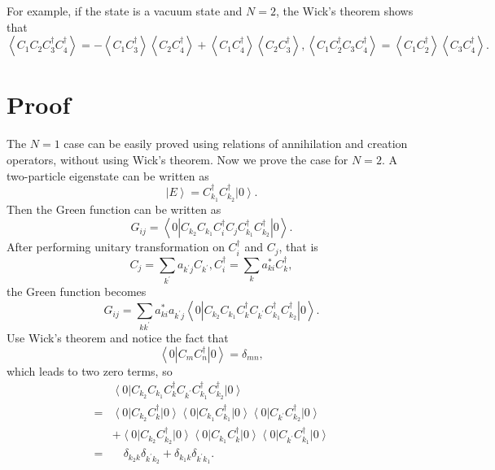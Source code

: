 \documentclass[prb,superscriptaddress,letter,10pt,onecolumn]{revtex4}
\begin{document}
For example, if the state is a vacuum state and $N=2$, the Wick's theorem shows that
\begin{equation}
	\left< C_1 C_2 C_3^\dagger C_4^\dagger \right> =
	-\left< C_1 C_3^\dagger\right>\left< C_2 C_4^\dagger\right>
	+\left< C_1 C_4^\dagger\right>\left< C_2 C_3^\dagger\right>, 
	\left< C_1 C_2^\dagger C_3 C_4^\dagger \right> =
	\left< C_1 C_2^\dagger\right>\left< C_3 C_4^\dagger\right>.
\end{equation}

\section{Proof}

The $N=1$ case can be easily proved using relations of annihilation and creation operators, without using Wick's theorem.
Now we prove the case for $N=2$.
A two-particle eigenstate can be written as
\begin{equation}
	\left|E\right> = C_{k_1}^\dagger C_{k_2}^\dagger\left|0\right>.
\end{equation}
Then the Green function can be written as
\begin{equation}
	G_{ij} = 
	\left< 0 \left| C_{k_2}C_{k_1}  C_i^\dagger C_j
	C_{k_1}^\dagger C_{k_2}^\dagger\right|0\right>.
\end{equation}
After performing unitary transformation on $C_i^\dagger$ and $C_j$, that is
\begin{equation}
	C_j = \sum_{k^{'}}a_{k^{'}j} C_{k^{'}},
	C_i^\dagger = \sum_{k}a_{ki}^* C_k^\dagger,
\end{equation}
the Green function becomes
\begin{equation}
	G_{ij} = \sum_{kk^{'}} a_{ki}^* a_{k^{'}j}
	\left< 0 \left| C_{k_2}C_{k_1}  C_k^\dagger C_{k^{'}}
	C_{k_1}^\dagger C_{k_2}^\dagger \right|0\right>.
\end{equation}
Use Wick's theorem and notice the fact that
\begin{equation}
	\left< 0 \left| C_m C_n^\dagger \right| 0 \right> = \delta_{mn},
\end{equation}
which leads to two zero terms, so
\begin{equation}
	\begin{aligned}
	&\left< 0 \right| C_{k_2}C_{k_1}  C_k^\dagger C_{k^{'}}
	C_{k_1}^\dagger C_{k_2}^\dagger\left|0\right> \\
	= &\left< 0 \right| C_{k_2} C_k^\dagger \left| 0 \right>
	\left< 0 \right| C_{k_1} C_{k_1}^\dagger \left| 0 \right>
	\left< 0 \right| C_{k^{'}} C_{k_2}^\dagger \left| 0 \right> \\
	&+ \left< 0 \right| C_{k_2} C_{k_2}^\dagger \left| 0 \right> 
	\left< 0 \right| C_{k_1} C_{k}^\dagger \left| 0 \right>
	\left< 0 \right| C_{k^{'}} C_{k_1}^\dagger \left| 0 \right> \\
	= & \quad\delta_{k_2 k} \delta_{k^{'}k_2} + \delta_{k_1 k} \delta_{k^{'}k_1}.
	\end{aligned}		
\end{equation}
\end{document}
